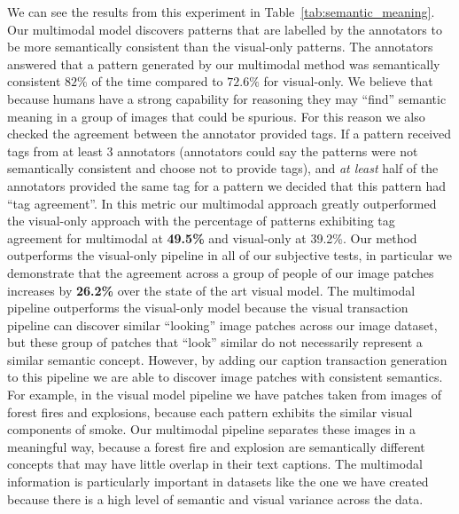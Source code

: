 \documentclass[10pt,twocolumn,letterpaper]{article}
\begin{document}
{We can see the results from this experiment in Table~\ref{tab:semantic_meaning}.
Our multimodal model discovers patterns that are labelled by the annotators to be more semantically consistent than the visual-only patterns.
The annotators answered that a pattern generated by our multimodal method was semantically consistent $82\%$ of the time compared to $72.6\%$ for visual-only.
We believe that because humans have a strong capability for reasoning they may ``find'' semantic meaning in a group of images that could be spurious.
For this reason we also checked the agreement between the annotator provided tags.
If a pattern received tags from at least 3 annotators (annotators could say the patterns were not semantically consistent and choose not to provide tags), and {\it at least} half of the annotators provided the same tag for a pattern we decided that this pattern had ``tag agreement''.
In this metric our multimodal approach greatly outperformed the visual-only approach with the percentage of patterns exhibiting tag agreement for multimodal at {\bf 49.5\%} and visual-only at  39.2\%.
Our method outperforms the visual-only pipeline in all of our subjective tests, in particular we demonstrate that the agreement across a group of people of our image patches increases by {\bf 26.2\%} over the state of the art visual model.
The multimodal pipeline outperforms the visual-only model because the visual transaction pipeline can discover similar ``looking'' image patches across our image dataset, but these group of patches that ``look'' similar do not necessarily represent a similar semantic concept.
However, by adding our caption transaction generation to this pipeline we are able to discover image patches with consistent semantics.
For example, in the visual model pipeline we have patches taken from images of forest fires and explosions, because each pattern exhibits the similar visual components of smoke.
Our multimodal pipeline separates these images in a meaningful way, because a forest fire and explosion are semantically different concepts that may have little overlap in their text captions.
The multimodal information is particularly important in datasets like the one we have created because there is a high level of semantic and visual variance across the data.

}
\end{document}
